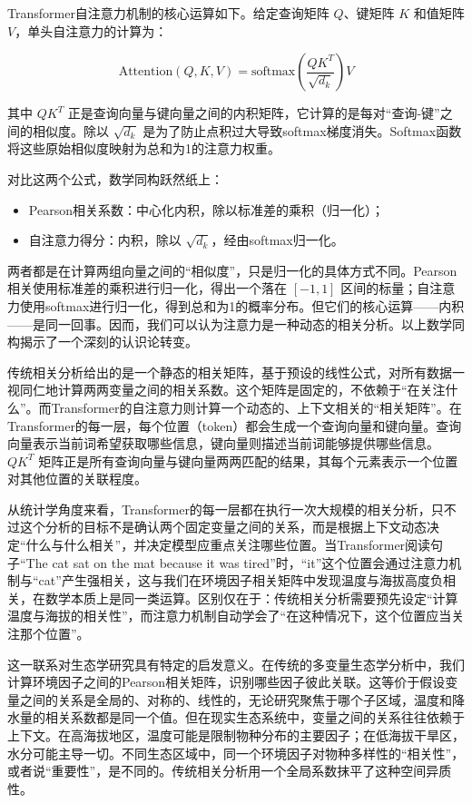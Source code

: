 \documentclass[
  twoside,12pt,fontset=none]{ctexbook}
\providecommand{\tightlist}{%
  \setlength{\itemsep}{0pt}\setlength{\parskip}{0pt}}
\begin{document}
Transformer自注意力机制的核心运算如下。给定查询矩阵 \(Q\)、键矩阵 \(K\) 和值矩阵 \(V\)，单头自注意力的计算为：

\[\text{Attention}(Q, K, V) = \text{softmax}\left(\frac{QK^T}{\sqrt{d_k}}\right) V\]

其中 \(QK^T\) 正是查询向量与键向量之间的内积矩阵，它计算的是每对``查询-键''之间的相似度。除以 \(\sqrt{d_k}\) 是为了防止点积过大导致softmax梯度消失。Softmax函数将这些原始相似度映射为总和为1的注意力权重。

对比这两个公式，数学同构跃然纸上：

\begin{itemize}
\tightlist
\item
  Pearson相关系数：中心化内积，除以标准差的乘积（归一化）；
\item
  自注意力得分：内积，除以 \(\sqrt{d_k}\)，经由softmax归一化。
\end{itemize}

两者都是在计算两组向量之间的``相似度''，只是归一化的具体方式不同。Pearson相关使用标准差的乘积进行归一化，得出一个落在 \([-1,1]\) 区间的标量；自注意力使用softmax进行归一化，得到总和为1的概率分布。但它们的核心运算------内积------是同一回事。因而，我们可以认为注意力是一种动态的相关分析。以上数学同构揭示了一个深刻的认识论转变。

传统相关分析给出的是一个静态的相关矩阵，基于预设的线性公式，对所有数据一视同仁地计算两两变量之间的相关系数。这个矩阵是固定的，不依赖于``在关注什么''。而Transformer的自注意力则计算一个动态的、上下文相关的``相关矩阵''。在Transformer的每一层，每个位置（token）都会生成一个查询向量和键向量。查询向量表示当前词希望获取哪些信息，键向量则描述当前词能够提供哪些信息。 \(QK^T\) 矩阵正是所有查询向量与键向量两两匹配的结果，其每个元素表示一个位置对其他位置的关联程度。

从统计学角度来看，Transformer的每一层都在执行一次大规模的相关分析，只不过这个分析的目标不是确认两个固定变量之间的关系，而是根据上下文动态决定``什么与什么相关''，并决定模型应重点关注哪些位置。当Transformer阅读句子``The cat sat on the mat because it was tired''时，``it''这个位置会通过注意力机制与``cat''产生强相关，这与我们在环境因子相关矩阵中发现温度与海拔高度负相关，在数学本质上是同一类运算。区别仅在于：传统相关分析需要预先设定``计算温度与海拔的相关性''，而注意力机制自动学会了``在这种情况下，这个位置应当关注那个位置''。

这一联系对生态学研究具有特定的启发意义。在传统的多变量生态学分析中，我们计算环境因子之间的Pearson相关矩阵，识别哪些因子彼此关联。这等价于假设变量之间的关系是全局的、对称的、线性的，无论研究聚焦于哪个子区域，温度和降水量的相关系数都是同一个值。但在现实生态系统中，变量之间的关系往往依赖于上下文。在高海拔地区，温度可能是限制物种分布的主要因子；在低海拔干旱区，水分可能主导一切。不同生态区域中，同一个环境因子对物种多样性的``相关性''，或者说``重要性''，是不同的。传统相关分析用一个全局系数抹平了这种空间异质性。
\end{document}
